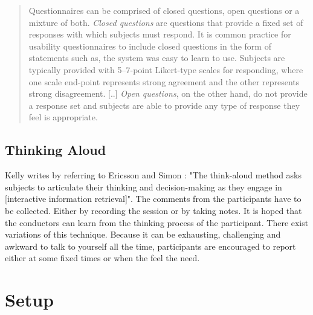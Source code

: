 \documentclass[11pt]{report}
\begin{document}
\begin{quote}
	Questionnaires can be comprised of closed questions, open questions or a mixture of both. \textit{Closed questions} are questions that provide a fixed set of responses with which subjects must respond. It is common practice for usability questionnaires to include closed questions in the form of statements such as, the system was easy to learn to use. Subjects are typically provided with 5–7-point Likert-type scales for responding, where one scale end-point represents strong agreement and the other represents strong disagreement. [..] \textit{Open questions}, on the other hand, do not provide a response set and subjects are able to provide any type of response they feel is appropriate. 
	\end{quote}


\subsection{Thinking Aloud}

Kelly \cite{Kelly2007} writes by referring to Ericsson and Simon \cite{Ericsson1993}: "The think-aloud method asks subjects to articulate their thinking and decision-making as they engage in [interactive information retrieval]". The comments from the participants have to be collected. Either by recording the session or by taking notes. It is hoped that the conductors can learn from the thinking process of the participant. There exist variations of this technique. Because it can be exhausting, challenging and awkward to talk to yourself all the time, participants are encouraged to report either at some fixed times or when the feel the need.

\section{Setup}
\end{document}
